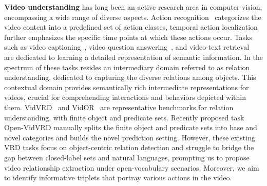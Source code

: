 \documentclass[letterpaper]{article}
\begin{document}
\textbf{Video understanding} has long been an active research area in computer vision, encompassing a wide range of diverse aspects.
Action recognition~\cite{Kay2017TheKH,8237884,monfortmoments} categorizes the video content into a predefined set of action classes, temporal action localization~\cite{Hei2015anet,liu2022fineaction} further emphasizes the specific time points at which these actions occur.
Tasks such as video captioning~\cite{chen2019deep}, video question answering~\cite{qian2023locate}, and video-text retrieval~\cite{song2021spatial} are dedicated to learning a detailed representation of semantic information.
In the spectrum of these tasks resides an intermediary domain referred to as relation understanding,  dedicated to capturing the diverse relations among objects. 
This contextual domain provides semantically rich intermediate representations for videos, crucial for comprehending interactions and behaviors depicted within them.
VidVRD~\cite{Shang2017VideoVR} and VidOR~\cite{shang2019annotating} are representative benchmarks for relation understanding, with finite object and predicate sets. 
Recently proposed task Open-VidVRD \cite{gao2023compositional} manually splits the finite object and predicate sets into base and novel categories and builds the novel prediction setting.
However, these existing VRD tasks focus on object-centric relation detection and struggle to bridge the gap between closed-label sets and natural languages, prompting us to propose video relationship extraction under open-vocabulary scenarios.
Moreover, we aim to identify informative triplets that portray various actions in the video.
\end{document}
